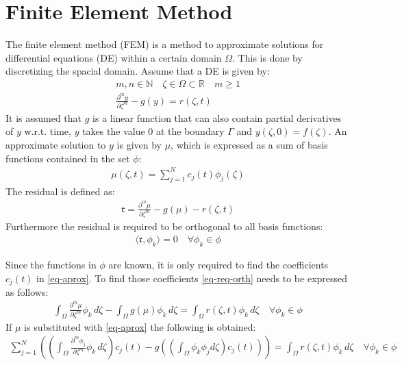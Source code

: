 \section{Finite Element Method}
The finite element method (FEM) is a method to approximate solutions for differential equations (DE) within a certain domain \(\Omega\).
This is done by discretizing the spacial domain.
Assume that a DE is given by:
\begin{gather}
m, n \in \mathbb{N} \quad \zeta \in \Omega \subset \mathbb{R} \quad m \geq 1 \\
\frac{\partial^{m} y}{\partial \zeta^{m}} -  g(y) = r(\zeta, t) \label{eq-pde-gen} 
\end{gather}
It is assumed that \(g\) is a linear function that can also contain partial derivatives of \(y\) w.r.t. time, \(y\) takes the value 0 at the boundary \(\Gamma\) and \(y(\zeta, 0) = f(\zeta)\).
An approximate solution to \(y\) is given by \(\mu\), which is expressed as a sum of basis functions contained in the set \(\phi\):
\begin{gather}
\mu(\zeta, t) = \sum_{j = 1}^{N} c_{j}(t)\phi_{j}(\zeta) \label{eq-aprox}
\end{gather}
The residual is defined as:
\begin{gather}
\mathfrak{r} = \frac{\partial^{m} \mu}{\partial \zeta^{m}} -  g(\mu) - r(\zeta, t) 
\end{gather}
Furthermore the residual is required to be orthogonal to all basis functions:
\begin{gather}
\langle \mathfrak{r}, \phi_{k} \rangle = 0 \quad \forall \phi_{k} \in \phi \label{eq-req-orth}
\end{gather}

Since the functions in \(\phi\) are known, it is only required to find the coefficients \(c_{j}(t)\) in \ref{eq-aprox}.
To find those coefficients \ref{eq-req-orth} needs to be expressed as follows:
\begin{gather}
\int_{\Omega} \frac{\partial^{m} \mu}{\partial \zeta^{m}} \phi_{k} \, d\zeta  -  \int_{\Omega} g(\mu) \phi_{k}        \, d\zeta = \int_{\Omega}  r(\zeta, t) \phi_{k}        \, d\zeta \quad \forall \phi_{k} \in \phi 
\end{gather}
If \(\mu\) is substituted with \ref{eq-aprox} the following is obtained:
\begin{gather}
\sum_{j = 1}^{N} ((\int_{\Omega} \frac{\partial^{m} \phi_{j}}{\partial \zeta^{m}} \phi_{k} \, d\zeta) c_{j}(t) - g((\int_{\Omega} \phi_k \phi_j d\zeta) c_{j}(t)))  = \int_{\Omega}  r(\zeta, t) \phi_{k}        \, d\zeta \quad \forall \phi_{k} \in \phi \label{eq-al}
\end{gather}

